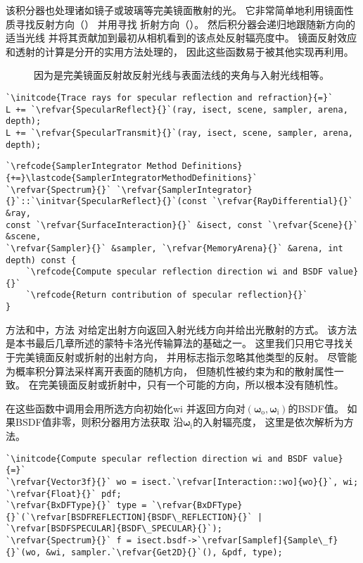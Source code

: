 该积分器也处理诸如镜子或玻璃等完美镜面散射的光。
它非常简单地利用镜面性质寻找反射方向（）
并用寻找
折射方向（）。
然后积分器会递归地跟随新方向的适当光线
并将其贡献加到最初从相机看到的该点处反射辐亮度中。
镜面反射效应和透射的计算是分开的实用方法处理的，
因此这些函数易于被其他实现再利用。
\begin{figure}[htbp]
    \centering
    \caption{因为是完美镜面反射故反射光线与表面法线的夹角与入射光线相等。}
    \label{fig:1.21}
\end{figure}
\begin{lstlisting}
`\initcode{Trace rays for specular reflection and refraction}{=}`
L += `\refvar{SpecularReflect}{}`(ray, isect, scene, sampler, arena, depth);
L += `\refvar{SpecularTransmit}{}`(ray, isect, scene, sampler, arena, depth);
\end{lstlisting}
\begin{lstlisting}
`\refcode{SamplerIntegrator Method Definitions}{+=}\lastcode{SamplerIntegratorMethodDefinitions}`
`\refvar{Spectrum}{}` `\refvar{SamplerIntegrator}{}`::`\initvar{SpecularReflect}{}`(const `\refvar{RayDifferential}{}` &ray,
const `\refvar{SurfaceInteraction}{}` &isect, const `\refvar{Scene}{}` &scene,
`\refvar{Sampler}{}` &sampler, `\refvar{MemoryArena}{}` &arena, int depth) const {
    `\refcode{Compute specular reflection direction wi and BSDF value}{}`
    `\refcode{Return contribution of specular reflection}{}`
}
\end{lstlisting}

方法和中，方法
对给定出射方向返回入射光线方向并给出光散射的方式。
该方法是本书最后几章所述的蒙特卡洛光传输算法的基础之一。
这里我们只用它寻找关于完美镜面反射或折射的出射方向，
并用标志指示忽略其他类型的反射。
尽管能
为概率积分算法采样离开表面的随机方向，
但随机性被约束为和的散射属性一致。
在完美镜面反射或折射中，只有一个可能的方向，所以根本没有随机性。

在这些函数中调用会用所选方向初始化{\ttfamily wi}
并返回方向对$({\bm \omega}_\mathrm{o},{\bm \omega}_\mathrm{i})$的BSDF值。
如果BSDF值非零，则积分器用方法获取
沿${\bm \omega}_\mathrm{i}$的入射辐亮度，
这里是依次解析为方法。
\begin{lstlisting}
`\initcode{Compute specular reflection direction wi and BSDF value}{=}`
`\refvar{Vector3f}{}` wo = isect.`\refvar[Interaction::wo]{wo}{}`, wi;
`\refvar{Float}{}` pdf;
`\refvar{BxDFType}{}` type = `\refvar{BxDFType}{}`(`\refvar[BSDFREFLECTION]{BSDF\_REFLECTION}{}` | `\refvar[BSDFSPECULAR]{BSDF\_SPECULAR}{}`);
`\refvar{Spectrum}{}` f = isect.bsdf->`\refvar[Samplef]{Sample\_f}{}`(wo, &wi, sampler.`\refvar{Get2D}{}`(), &pdf, type);
\end{lstlisting}


